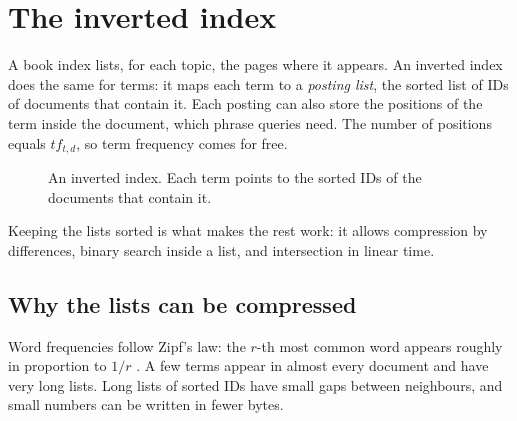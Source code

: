 \documentclass[9pt,twocolumn,a4paper]{extarticle}
\newcommand{\code}[1]{\texttt{#1}}
\begin{document}
\section{The inverted index}
\label{sec:index}
A book index lists, for each topic, the pages where it appears. An inverted index does the same for terms: it maps each term to a \emph{posting list}, the sorted list of IDs of documents that contain it. Each posting can also store the positions of the term inside the document, which phrase queries need. The number of positions equals $tf_{t,d}$, so term frequency comes for free.

\begin{figure}[H]
\centering
{}
\caption{An inverted index. Each term points to the sorted IDs of the documents that contain it.}
\label{fig:inverted}
\end{figure}

Keeping the lists sorted is what makes the rest work: it allows compression by differences, binary search inside a list, and intersection in linear time.

\subsection{Why the lists can be compressed}
Word frequencies follow Zipf's law: the $r$-th most common word appears roughly in proportion to $1/r$ \cite{manning2008ir}. A few terms appear in almost every document and have very long lists. Long lists of sorted IDs have small gaps between neighbours, and small numbers can be written in fewer bytes.
\end{document}
